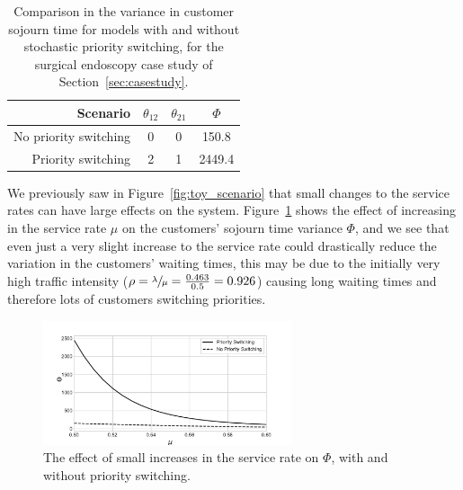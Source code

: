 \documentclass{article}
\begin{document}
\begin{table}
\begin{center}
\begin{tabular}{rccc}
\toprule
Scenario & $\theta_{12}$ & $\theta_{21}$ & $\Phi$ \\
\midrule
No priority switching & 0 & 0 & 150.8 \\
Priority switching & 2 & 1 & 2449.4 \\
\bottomrule
\end{tabular}
\end{center}
\caption{Comparison in the variance in customer sojourn time for models with and
without stochastic priority switching, for the surgical endoscopy case study of
Section~\ref{sec:casestudy}.}
\label{tbl:phi_with_without}
\end{table}

We previously saw in Figure~\ref{fig:toy_scenario} that small changes to the
service rates can have large effects on the system. Figure~\ref{fig:phi_vary_mu}
shows the effect of increasing in the service rate $\mu$ on the customers'
sojourn time variance $\Phi$, and we see that even just a very slight increase
to the service rate could drastically reduce the variation in the customers'
waiting times, this may be due to the initially very high traffic intensity
($\rho = \sfrac{\lambda}{\mu} = \frac{0.463}{0.5} = 0.926$) causing long waiting
times and therefore lots of customers switching priorities.

\begin{figure}
\begin{center}
  \includegraphics[width=0.65\textwidth]{img/vary_service_rate_effect_variance.pdf}
\end{center}
\caption{The effect of small increases in the service rate on $\Phi$, with and
without priority switching.}
\label{fig:phi_vary_mu}
\end{figure}
\end{document}

